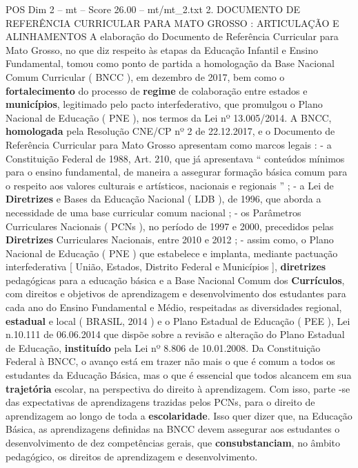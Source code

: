 \begin{textsample}{POS Dim 2 – mt – Score 26.00 – mt/mt\_2.txt}  \label{ex:f2_pos_225}
2.
DOCUMENTO DE REFERÊNCIA CURRICULAR PARA MATO GROSSO : ARTICULAÇÃO E ALINHAMENTOS A elaboração do Documento de Referência Curricular para Mato Grosso, no que diz respeito às etapas da Educação Infantil e Ensino Fundamental, tomou como ponto de partida a homologação da Base Nacional Comum Curricular ( BNCC ), em dezembro de 2017, bem como o \textbf{fortalecimento} do processo de \textbf{regime} de colaboração entre estados e \textbf{municípios}, legitimado pelo pacto interfederativo, que promulgou o Plano Nacional de Educação ( PNE ), nos termos da Lei nº 13.005/2014.
A BNCC, \textbf{homologada} pela Resolução CNE/CP nº 2 de 22.12.2017, e o Documento de Referência Curricular para Mato Grosso apresentam como marcos legais : - a Constituição Federal de 1988, Art. 210, que já apresentava “ conteúdos mínimos para o ensino fundamental, de maneira a assegurar formação básica comum para o respeito aos valores culturais e artísticos, nacionais e regionais ” ; - a Lei de \textbf{Diretrizes} e Bases da Educação Nacional ( LDB ), de 1996, que aborda a necessidade de uma base curricular comum nacional ; - os Parâmetros Curriculares Nacionais ( PCNs ), no período de 1997 e 2000, precedidos pelas \textbf{Diretrizes} Curriculares Nacionais, entre 2010 e 2012 ; - assim como, o Plano Nacional de Educação ( PNE ) que estabelece e implanta, mediante pactuação interfederativa [ União, Estados, Distrito Federal e Municípios ], \textbf{diretrizes} pedagógicas para a educação básica e a Base Nacional Comum dos \textbf{Currículos}, com direitos e objetivos de aprendizagem e desenvolvimento dos estudantes para cada ano do Ensino Fundamental e Médio, respeitadas as diversidades regional, \textbf{estadual} e local ( BRASIL, 2014 ) e o Plano Estadual de Educação ( PEE ), Lei n.10.111 de 06.06.2014 que dispõe sobre a revisão e alteração do Plano Estadual de Educação, \textbf{instituído} pela Lei nº 8.806 de 10.01.2008.
Da Constituição Federal à BNCC, o avanço está em trazer não mais o que é comum a todos os estudantes da Educação Básica, mas o que é essencial que todos alcancem em sua \textbf{trajetória} escolar, na perspectiva do direito à aprendizagem.
Com isso, parte -se das expectativas de aprendizagens trazidas pelos PCNs, para o direito de aprendizagem ao longo de toda a \textbf{escolaridade}.
Isso quer dizer que, na Educação Básica, as aprendizagens definidas na BNCC devem assegurar aos estudantes o desenvolvimento de dez competências gerais, que \textbf{consubstanciam}, no âmbito pedagógico, os direitos de aprendizagem e desenvolvimento.

\end{textsample}
